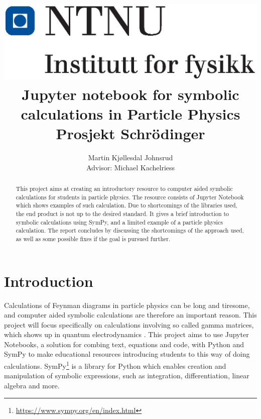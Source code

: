 \documentclass{article}
\title{
    \flushleft
    \includegraphics[width=.3\textwidth]{NTNU_logo.png}\\
    [1cm]
    \centering
    Jupyter notebook for symbolic calculations in Particle Physics
 \\
    \small{Prosjekt Schrödinger}
}
\author{
    Martin Kjøllesdal Johnsrud\\
    \small{Advisor: Michael Kachelriess}
    }
\begin{document}
    \maketitle
    \begin{abstract}
        This project aims at creating an introductory resource to computer aided symbolic calculations for students in particle physics.
        The resource consists of Jupyter Notebook which shows examples of such calculation.
        Due to shortcomings of the libraries used, the end product is not up to the desired standard.
        It gives a brief introduction to symbolic calculations using SymPy, and a limited example of a particle physics calculation.
        The report concludes by discussing the shortcomings of the approach used, as well as some possible fixes if the goal is pursued further.
       \end{abstract}

    \section*{Introduction}
    Calculations of Feynman diagrams in particle physics can be long and tiresome, and computer aided symbolic calculations are therefore an important reason.
    This project will focus specifically on calculations involving so called gamma matrices, which shows up in quantum electrodynamics \cite{griffiths}.
    This project aims to use Jupyter Notebooks, a solution for combing text, equations and code, with Python and SymPy to make educational resources introducing students to this way of doing calculations. 
    SymPy\footnote{\url{https://www.sympy.org/en/index.html}} is a library for Python which enables creation and manipulation of symbolic expressions, such as integration, differentiation, linear algebra and more.
\end{document}
